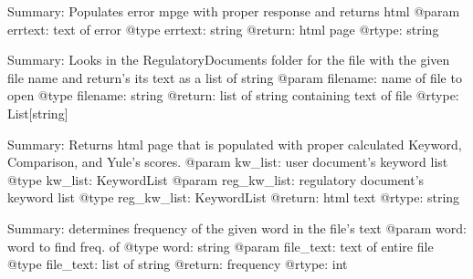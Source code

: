\documentclass[letterpaper,10pt,english]{sphinxmanual}
\begin{document}

\begin{fulllineitems}
\label{\detokenize{functionsv1:common_functions.geterrorpage}}
Summary: Populates error mpge with proper response and returns html
@param errtext: text of error
@type errtext: string
@return: html page
@rtype: string

\end{fulllineitems}


\begin{fulllineitems}
\label{\detokenize{functionsv1:common_functions.getregulatorydoctext}}
Summary: Looks in the RegulatoryDocuments folder for the file with the given file name and return’s its text as a list of string
@param filename: name of file to open
@type filename: string
@return: list of string containing text of file
@rtype: List{[}string{]}

\end{fulllineitems}


\begin{fulllineitems}
\label{\detokenize{functionsv1:common_functions.getscorepage}}
Summary: Returns html page that is populated with proper calculated Keyword, Comparison, and Yule’s scores.
@param kw\_list: user document’s keyword list
@type kw\_list: KeywordList
@param reg\_kw\_list: regulatory document’s keyword list
@type reg\_kw\_list: KeywordList
@return: html text
@rtype: string

\end{fulllineitems}


\begin{fulllineitems}
\label{\detokenize{functionsv1:common_functions.getwordfrequency}}
Summary: determines frequency of the given word in the file’s text
@param word: word to find freq. of
@type word: string
@param file\_text: text of entire file
@type file\_text: list of string
@return: frequency
@rtype: int

\end{fulllineitems}
\end{document}
